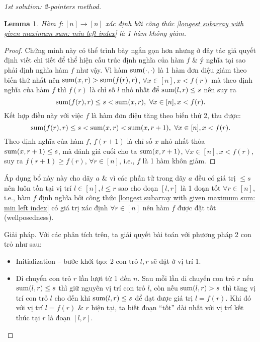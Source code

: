 \documentclass{article}
\newtheorem{lemma}{Lemma}
\begin{document}
\begin{proof}[1st solution: 2-pointers method]
     \begin{lemma}
         Hàm $f:[n]\to[n]$ xác định bởi công thức \eqref{longest subarray with given maximum sum: min left index} là 1 hàm không giảm.
     \end{lemma}

     \begin{proof}
         Chứng minh này có thể trình bày ngắn gọn hơn nhưng ở đây tác giả quyết định viết chi tiết để thể hiện cấu trúc định nghĩa của hàm $f$ \& ý nghĩa tại sao phải định nghĩa hàm $f$ như vậy. Vì hàm ${\rm sum}(\cdot,\cdot)$ là 1 hàm đơn điệu giảm theo biến thứ nhất nên ${\rm sum}(x,r) > {\rm sum}(f(r),r)$, $\forall x\in[n],x < f(r)$ mà theo định nghĩa của hàm $f$ thì $f(r)$ là chỉ số $l$ nhỏ nhất để ${\rm sum}(l,r)\le s$ nên suy ra
         \begin{equation*}
             {\rm sum}(f(r),r)\le s < {\rm sum}(x,r),\ \forall x\in[n],x < f(r).
         \end{equation*}
         Kết hợp điều này với việc $f$ là hàm đơn điệu tăng theo biến thứ 2, thu được:
         \begin{equation*}
             {\rm sum}(f(r),r)\le s < {\rm sum}(x,r) < {\rm sum}(x,r + 1),\ \forall x\in[n],x < f(r).
         \end{equation*}
         Theo định nghĩa của hàm $f$, $f(r + 1)$ là chỉ số $x$ nhỏ nhất thỏa ${\rm sum}(x,r + 1)\le s$, mà đánh giá cuối cho ta ${\rm sum}(x,r + 1)$, $\forall x\in[n],x < f(r)$, suy ra $f(r + 1)\ge f(r)$, $\forall r\in[n]$, i.e., $f$ là 1 hàm khôn giảm.
     \end{proof}
     Áp dụng bổ này này cho dãy $a$ \& vì các phần tử trong dãy $a$ đều có giá trị $\le s$ nên luôn tồn tại vị trí $l\in[n],l\le r$ sao cho đoạn $[l,r]$ là 1 đoạn tốt $\forall r\in[n]$, i.e., hàm $f$ định nghĩa bởi công thức \eqref{longest subarray with given maximum sum: min left index} có giá trị xác định $\forall r\in[n]$ nên hàm $f$ được đặt tốt (wellposedness).
     \item {\sf Giải pháp.} Với các phân tích trên, ta giải quyết bài toán với phương pháp 2 con trỏ như sau:
     \begin{itemize}
         \item Initialization -- bước khởi tạo: 2 con trỏ $l,r$ sẽ đặt ở vị trí 1.
         \item Di chuyển con trỏ $r$ lần lượt từ 1 đến $n$. Sau mỗi lần di chuyển con trỏ $r$ nếu ${\rm sum}(l,r)\le s$ thì giữ nguyên vị trí con trỏ $l$, còn nếu ${\rm sum}(l,r) > s$ thì tăng vị trí con trỏ $l$ cho đến khi ${\rm sum}(l,r)\le s$ để đạt được giá trị $l = f(r)$. Khi đó với vị trí $l = f(r)$ \& $r$ hiện tại, ta biết đoạn ``tốt'' dài nhất với vị trí kết thúc tại $r$ là đoạn $[l,r]$.

\end{itemize}
\end{proof}
\end{document}
